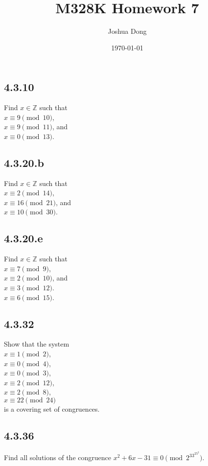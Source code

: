 \documentclass{article}
\begin{document}
\title{M328K\: Homework 7}
\author{Joshua Dong}
\date{\today}
\maketitle



\subsection{4.3.10}
Find $x\in\mathbb{Z}$ such that\
\\$x\equiv9\pmod{10}$,
\\$x\equiv9\pmod{11}$, and
\\$x\equiv0\pmod{13}$.
\\

\subsection{4.3.20.b}
Find $x\in\mathbb{Z}$ such that\
\\$x\equiv2\pmod{14}$,
\\$x\equiv16\pmod{21}$, and
\\$x\equiv10\pmod{30}$.
\\

\subsection{4.3.20.e}
Find $x\in\mathbb{Z}$ such that\
\\$x\equiv7\pmod{9}$,
\\$x\equiv2\pmod{10}$, and
\\$x\equiv3\pmod{12}$.
\\$x\equiv6\pmod{15}$.
\\

\subsection{4.3.32}
Show that the system 
\\$x\equiv1\pmod{2}$,
\\$x\equiv0\pmod{4}$,
\\$x\equiv0\pmod{3}$,
\\$x\equiv2\pmod{12}$,
\\$x\equiv2\pmod{8}$,
\\$x\equiv22\pmod{24}$
\\is a covering set of congruences.
\\

\subsection{4.3.36}
Find all solutions of the congruence $x^2+6x-31\equiv0\pmod{2^33^25^2}$.
\\
\end{document}
